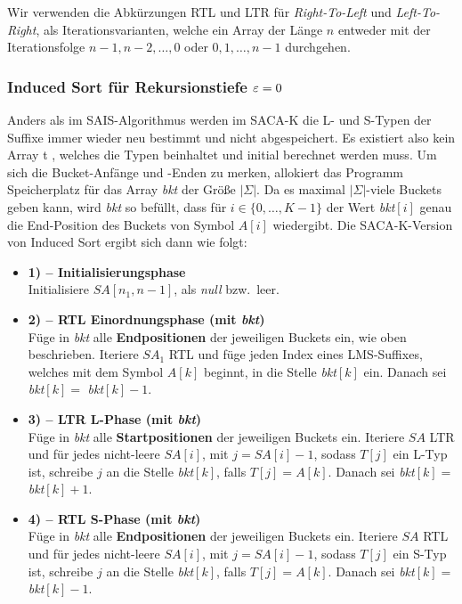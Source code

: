 Wir verwenden die Abkürzungen RTL und LTR für \textit{Right-To-Left} und \textit{Left-To-Right}, als Iterationsvarianten, welche ein Array der Länge $n$ entweder mit der Iterationsfolge $n-1, n-2, \ldots, 0$ oder $0, 1, \ldots, n - 1$ durchgehen. 

\subsubsection{ Induced Sort für Rekursionstiefe $\varepsilon = 0$}

Anders als im SAIS-Algorithmus werden im SACA-K die L- und S-Typen der Suffixe immer wieder neu bestimmt und nicht abgespeichert. Es existiert also kein Array t , welches die Typen beinhaltet und initial berechnet werden muss. Um sich die Bucket-Anfänge und -Enden zu merken, allokiert das Programm Speicherplatz für das Array \textit{bkt} der Größe $|\Sigma|$. Da es maximal $|\Sigma|$-viele Buckets geben kann, wird \textit{bkt} so befüllt, dass für $i \in \{0, \ldots, K-1\}$ der Wert \textit{bkt}$[i]$ genau die End-Position des Buckets von Symbol $A[i]$ wiedergibt. Die SACA-K-Version von Induced Sort ergibt sich dann wie folgt:
\begin{itemize}
\item \textbf{1) -- Initialisierungsphase} \\
Initialisiere $SA[n_1, n-1]$, als \textit{null} bzw.\ leer.

\item \textbf{2) -- RTL Einordnungsphase (mit \textit{bkt})} \\
Füge in \textit{bkt}  alle \textbf{Endpositionen} der jeweiligen Buckets ein, wie oben beschrieben. Iteriere $SA_1$ RTL und füge jeden Index eines LMS-Suffixes, welches mit dem Symbol $A[k]$ beginnt, in die Stelle \textit{bkt}$[k]$ ein. Danach sei \textit{bkt}$[k] = $ \textit{bkt}$[k]-1$.

\item \textbf{3) -- LTR L-Phase (mit \textit{bkt})} \\
Füge in \textit{bkt}  alle \textbf{Startpositionen} der jeweiligen Buckets ein. Iteriere $SA$ LTR und für jedes nicht-leere $SA[i]$, mit $j = SA[i]-1$, sodass $T[j]$ ein L-Typ ist, schreibe $j$ an die Stelle \textit{bkt}$[k]$, falls $T[j] = A[k]$. Danach sei \textit{bkt}$[k] = $ \textit{bkt}$[k]+1$.

\item \textbf{4) -- RTL S-Phase (mit \textit{bkt})} \\
Füge in \textit{bkt}  alle \textbf{Endpositionen} der jeweiligen Buckets ein. Iteriere $SA$ RTL und für jedes nicht-leere $SA[i]$, mit $j = SA[i]-1$, sodass $T[j]$ ein S-Typ ist, schreibe $j$ an die Stelle \textit{bkt}$[k]$, falls $T[j] = A[k]$. Danach sei \textit{bkt}$[k] = $ \textit{bkt}$[k]-1$.
\end{itemize}

